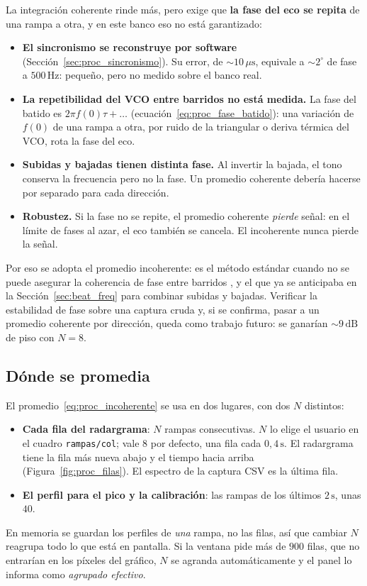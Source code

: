 La integración coherente rinde más, pero exige que \textbf{la fase del eco
se repita} de una rampa a otra, y en este banco eso no está garantizado:
\begin{itemize}
  \item \textbf{El sincronismo se reconstruye por software}
    (Sección~\ref{sec:proc_sincronismo}). Su error, de
    $\sim 10\,\mu\text{s}$, equivale a $\sim 2^\circ$ de fase a
    $500\,\text{Hz}$: pequeño, pero no medido sobre el banco real.
  \item \textbf{La repetibilidad del VCO entre barridos no está medida.}
    La fase del batido es $2\pi f(0)\tau + \dots$ (ecuación~\eqref{eq:proc_fase_batido}):
    una variación de $f(0)$ de una rampa a otra, por ruido de la
    triangular o deriva térmica del VCO, rota la fase del eco.
  \item \textbf{Subidas y bajadas tienen distinta fase.} Al invertir la
    bajada, el tono conserva la frecuencia pero no la fase. Un promedio
    coherente debería hacerse por separado para cada dirección.
  \item \textbf{Robustez.} Si la fase no se repite, el promedio coherente
    \emph{pierde} señal: en el límite de fases al azar, el eco también se
    cancela. El incoherente nunca pierde la señal.
\end{itemize}
Por eso se adopta el promedio incoherente: es el método estándar cuando no
se puede asegurar la coherencia de fase entre barridos \cite{Richards2014},
y el que ya se anticipaba en la Sección~\ref{sec:beat_freq} para combinar
subidas y bajadas. Verificar la estabilidad de fase sobre una captura cruda
y, si se confirma, pasar a un promedio coherente por dirección, queda como
trabajo futuro: se ganarían $\sim 9\,\text{dB}$ de piso con $N = 8$.

\subsection{Dónde se promedia}

El promedio~\eqref{eq:proc_incoherente} se usa en dos lugares, con dos $N$
distintos:
\begin{itemize}
  \item \textbf{Cada fila del radargrama}: $N$ rampas consecutivas. $N$ lo elige el
    usuario en el cuadro \texttt{rampas/col}; vale $8$ por defecto, una
    fila cada $0{,}4\,\text{s}$. El radargrama tiene la fila más nueva abajo y el
    tiempo hacia arriba (Figura~\ref{fig:proc_filas}). El espectro de la
    captura CSV es la última fila.
  \item \textbf{El perfil para el pico y la calibración}: las rampas de los
    últimos $2\,\text{s}$, unas $40$.
\end{itemize}
En memoria se guardan los perfiles de \emph{una} rampa, no las filas, así
que cambiar $N$ reagrupa todo lo que está en pantalla. Si la ventana pide
más de $900$ filas, que no entrarían en los píxeles del gráfico, $N$ se
agranda automáticamente y el panel lo informa como \emph{agrupado
efectivo}.

